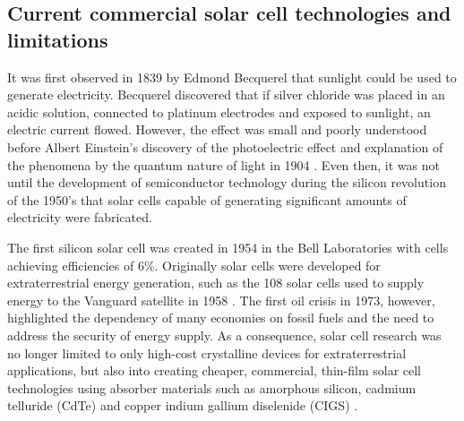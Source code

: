 \documentclass[11pt, twoside]{report}
\begin{document}



\subsection{Current commercial solar cell technologies and limitations}\label{current_tech}
It was first observed in 1839 by Edmond Becquerel that sunlight could be used to generate electricity. Becquerel discovered that if  silver chloride was placed in an acidic solution, connected to platinum electrodes and exposed to sunlight, an electric current flowed. However, the effect was small and poorly understood before Albert Einstein's discovery of the photoelectric effect and explanation of the phenomena by the quantum nature of light in 1904 \cite{PV_history1}. Even then, it was not until the development of semiconductor technology during the silicon revolution of the 1950's that solar cells capable of generating significant amounts of electricity were fabricated.

The first silicon solar cell was created in 1954 in the Bell Laboratories with cells achieving efficiencies of 6\%. 
Originally solar cells were developed for extraterrestrial energy generation, such as the 108 solar cells used to supply energy to the Vanguard satellite in 1958 \cite{PV_history1}. The first oil crisis in 1973, however, highlighted the dependency of many economies on fossil fuels and the need to address the security of energy supply. 
As a consequence, solar cell research was no longer limited to only high-cost crystalline devices for extraterrestrial applications, but also into creating cheaper, commercial, thin-film solar cell technologies using absorber materials such as amorphous silicon, cadmium telluride (CdTe) and copper indium gallium diselenide (CIGS) \cite{PV_history2}.
\end{document}
